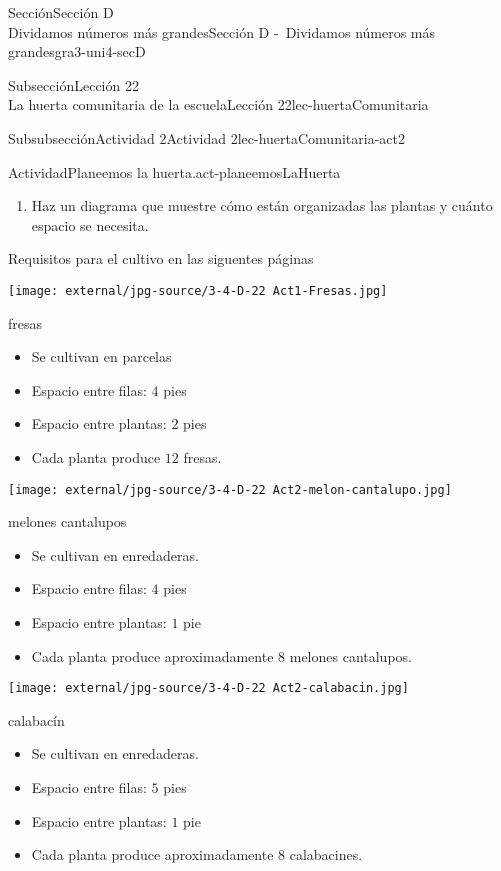 \begin{sectionptx}{Sección}{{\Large Sección D\\}Dividamos números más grandes}{}{Sección D -~Dividamos números más grandes}{}{}{gra3-uni4-secD}
\begin{subsectionptx}{Subsección}{{\normalsize Lección 22\\[-0.05cm]}La huerta comunitaria de la escuela}{}{Lección 22}{}{}{lec-huertaComunitaria}
\begin{subsubsectionptx}{Subsubsección}{Actividad 2}{}{Actividad 2}{}{}{lec-huertaComunitaria-act2}
\begin{activity}{Actividad}{Planeemos la huerta.}{act-planeemosLaHuerta}
\begin{enumerate}
\begin{enumerate}
\end{enumerate}
\item{}Haz un diagrama que muestre cómo están organizadas las plantas y cuánto espacio se necesita.%
\end{enumerate}
\alert{Requisitos para el cultivo en las siguentes páginas}%
\begin{sidebyside}{2}{0.025}{0.025}{0.05}%
\begin{sbspanel}{0.45}%
\texttt{[image: external/jpg-source/3-4-D-22 Act1-Fresas.jpg]}
%
\par
fresas%
%
\begin{itemize}[label=\textbullet]
\item{}Se cultivan en parcelas%
\item{}Espacio entre filas: \(4\) pies%
\item{}Espacio entre plantas: \(2\) pies%
\item{}Cada planta produce \(12\) fresas.%
\end{itemize}
\end{sbspanel}%
\begin{sbspanel}{0.45}%
\texttt{[image: external/jpg-source/3-4-D-22 Act2-melon-cantalupo.jpg]}
%
\par
melones cantalupos%
%
\begin{itemize}[label=\textbullet]
\item{}Se cultivan en enredaderas.%
\item{}Espacio entre filas: \(4\) pies%
\item{}Espacio entre plantas: \(1\) pie%
\item{}Cada planta produce aproximadamente \(8\) melones cantalupos.%
\end{itemize}
\end{sbspanel}%
\end{sidebyside}%
\begin{sidebyside}{2}{0.025}{0.025}{0.05}%
\begin{sbspanel}{0.45}%
\texttt{[image: external/jpg-source/3-4-D-22 Act2-calabacin.jpg]}
%
\par
calabacín%
%
\begin{itemize}[label=\textbullet]
\item{}Se cultivan en enredaderas.%
\item{}Espacio entre filas: \(5\) pies%
\item{}Espacio entre plantas: \(1\) pie%
\item{}Cada planta produce aproximadamente \(8\) calabacines.%

\end{itemize}
\end{sbspanel}
\end{sidebyside}
\end{activity}
\end{subsubsectionptx}
\end{subsectionptx}
\end{sectionptx}
